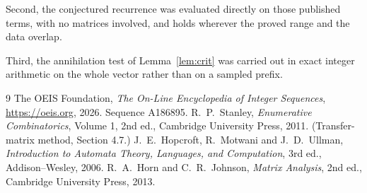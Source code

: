 \documentclass[11pt,a4paper]{article}
\theoremstyle{plain}
\theoremstyle{definition}
\begin{document}
Second, the conjectured recurrence was evaluated directly on those published terms, with no
matrices involved, and holds wherever the proved range and the data overlap.

Third, the annihilation test of Lemma~\ref{lem:crit} was carried out in exact integer
arithmetic on the whole vector rather than on a sampled prefix.

\begin{thebibliography}{9}
 The OEIS Foundation, \emph{The On-Line Encyclopedia of Integer
Sequences}, \url{https://oeis.org}, 2026. Sequence A186895.
 R.~P.~Stanley, \emph{Enumerative Combinatorics}, Volume 1, 2nd ed.,
Cambridge University Press, 2011. (Transfer-matrix method, Section 4.7.)
 J.~E.~Hopcroft, R.~Motwani and J.~D.~Ullman, \emph{Introduction to Automata
Theory, Languages, and Computation}, 3rd ed., Addison--Wesley, 2006.
 R.~A.~Horn and C.~R.~Johnson, \emph{Matrix Analysis}, 2nd ed., Cambridge
University Press, 2013.
\end{thebibliography}
\end{document}
